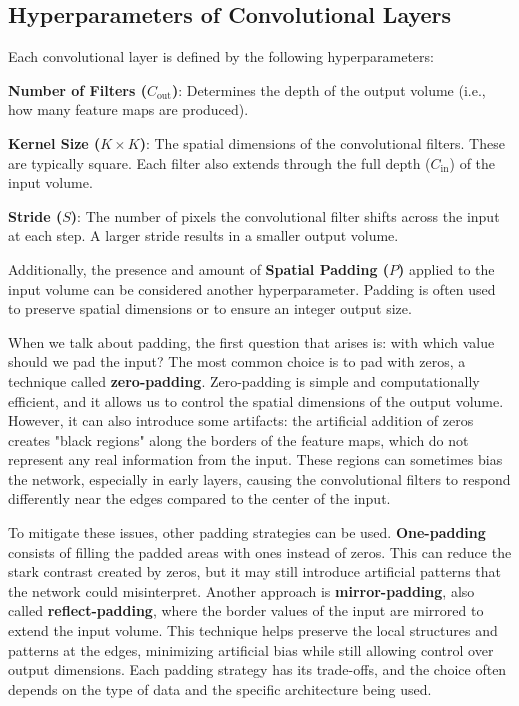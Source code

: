 \subsection{Hyperparameters of Convolutional Layers}
Each convolutional layer is defined by the following hyperparameters:
\begin{compactitemize}
    \item \textbf{Number of Filters ($C_{\text{out}}$)}: Determines the depth of the output volume (i.e., how many feature maps are produced).
    \item \textbf{Kernel Size ($K \times K$)}: The spatial dimensions of the convolutional filters. These are typically square. Each filter also extends through the full depth ($C_{\text{in}}$) of the input volume.
    \item \textbf{Stride ($S$)}: The number of pixels the convolutional filter shifts across the input at each step. A larger stride results in a smaller output volume.
\end{compactitemize}
Additionally, the presence and amount of \textbf{Spatial Padding ($P$)} applied to the input volume can be considered another hyperparameter. Padding is often used to preserve spatial dimensions or to ensure an integer output size.

\begin{infobox}
    When we talk about padding, the first question that arises is: with which value should we pad the input? The most common choice is to pad with zeros, a technique called \textbf{zero-padding}. Zero-padding is simple and computationally efficient, and it allows us to control the spatial dimensions of the output volume. However, it can also introduce some artifacts: the artificial addition of zeros creates "black regions" along the borders of the feature maps, which do not represent any real information from the input. These regions can sometimes bias the network, especially in early layers, causing the convolutional filters to respond differently near the edges compared to the center of the input.  
    
    To mitigate these issues, other padding strategies can be used. \textbf{One-padding} consists of filling the padded areas with ones instead of zeros. This can reduce the stark contrast created by zeros, but it may still introduce artificial patterns that the network could misinterpret. Another approach is \textbf{mirror-padding}, also called \textbf{reflect-padding}, where the border values of the input are mirrored to extend the input volume. This technique helps preserve the local structures and patterns at the edges, minimizing artificial bias while still allowing control over output dimensions. Each padding strategy has its trade-offs, and the choice often depends on the type of data and the specific architecture being used.
\end{infobox}

